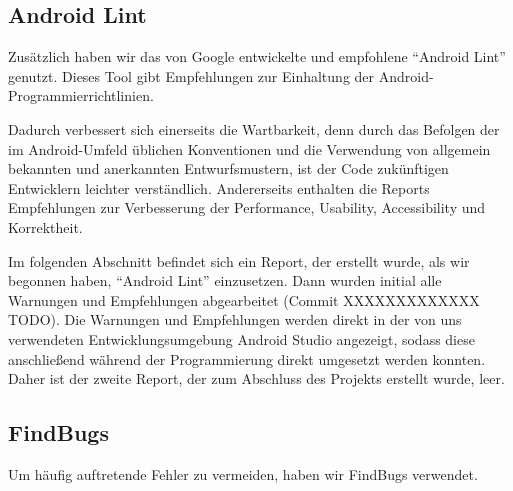 \clearpage
\subsection{Android Lint}

Zusätzlich haben wir das von Google entwickelte und empfohlene ``Android Lint''
genutzt. Dieses Tool gibt Empfehlungen zur Einhaltung der Android-Programmierrichtlinien.

Dadurch verbessert sich einerseits die Wartbarkeit, denn durch das Befolgen der im Android-Umfeld üblichen
 Konventionen und die Verwendung von allgemein bekannten und anerkannten Entwurfsmustern, ist der Code zukünftigen
Entwicklern leichter verständlich.
Andererseits enthalten die Reports Empfehlungen zur Verbesserung der Performance, Usability, Accessibility und Korrektheit.

Im folgenden Abschnitt befindet sich ein Report, der erstellt wurde,
als wir begonnen haben, ``Android Lint'' einzusetzen. Dann wurden initial alle
Warnungen und Empfehlungen abgearbeitet (Commit XXXXXXXXXXXXX TODO).
Die Warnungen und Empfehlungen werden direkt in der von uns verwendeten
Entwicklungsumgebung Android Studio angezeigt, sodass diese anschließend während
der Programmierung direkt umgesetzt werden konnten. Daher ist der zweite Report,
der zum Abschluss des Projekts erstellt wurde, leer.






%


\clearpage
\subsection{FindBugs}

Um häufig auftretende Fehler zu vermeiden, haben wir FindBugs verwendet.


